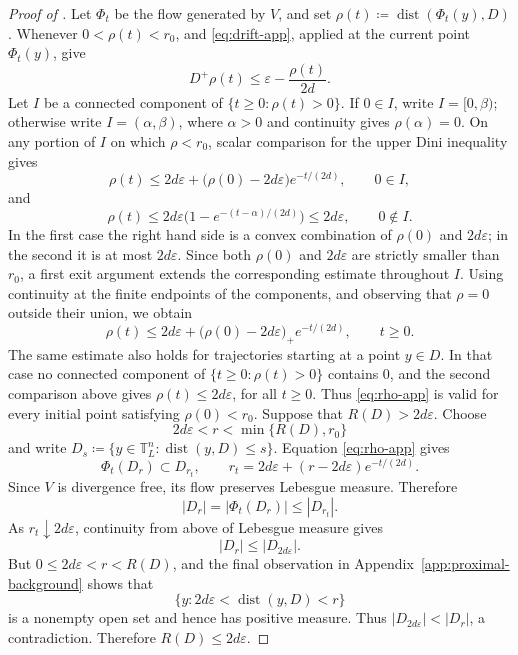 \documentclass[11pt,reqno,noamsfonts]{amsart}
\theoremstyle{definition}
\theoremstyle{remark}
\newcommand{\T}{\mathbb T}
\newcommand{\dist}{\operatorname{dist}}
\newcommand{\Dplus}{D^+}
\begin{document}
\begin{proof}[Proof of ]
Let $\Phi_t$ be the flow generated by $V$, and set 
$\rho(t)\coloneqq\dist(\Phi_t(y),D)$. 
Whenever $0<\rho(t)<r_0$,
 and \eqref{eq:drift-app},
applied at the current point $\Phi_t(y)$, give
\[
  \Dplus\rho(t)
  \le\varepsilon-\frac{\rho(t)}{2d}.
\]
Let $I$ be a connected component of
$\{t\ge0:\rho(t)>0\}$. If $0\in I$, write $I=[0,\beta)$;
otherwise write $I=(\alpha,\beta)$, where $\alpha>0$ and continuity
gives $\rho(\alpha)=0$. On any portion of $I$ on which
$\rho<r_0$, scalar comparison for the upper Dini inequality gives
\[
  \rho(t)
  \le
  2d\varepsilon+
  \bigl(\rho(0)-2d\varepsilon\bigr)e^{-t/(2d)},
  \qquad 0\in I,
\]
and
\[
  \rho(t)
  \le
  2d\varepsilon
  \bigl(1-e^{-(t-\alpha)/(2d)}\bigr)
  \le2d\varepsilon,
  \qquad 0\notin I.
\]
In the first case the right hand side is a convex combination of
$\rho(0)$ and $2d\varepsilon$; in the second it is at most
$2d\varepsilon$. Since both $\rho(0)$ and $2d\varepsilon$ are
strictly smaller than $r_0$, a first exit argument extends the
corresponding estimate throughout $I$. Using continuity at the finite
endpoints of the components, and observing that $\rho=0$ outside their
union, we obtain
\begin{equation}\label{eq:rho-app}
  \rho(t)
  \le
  2d\varepsilon+
  \bigl(\rho(0)-2d\varepsilon\bigr)_+e^{-t/(2d)},
  \qquad t\ge0.
\end{equation}
The same estimate also holds for trajectories starting at a point
$y\in D$. In that case no connected component of
$\{t\ge0:\rho(t)>0\}$ contains $0$, and the second comparison above
gives
  $\rho(t)\le 2d\varepsilon$, 
  for all $t\ge0$.
Thus \eqref{eq:rho-app} is valid for every initial point satisfying
$\rho(0)<r_0$.
Suppose that $R(D)>2d\varepsilon$. Choose
\[
  2d\varepsilon<r<\min\{R(D),r_0\}
\]
and write
  $D_s\coloneqq\{y\in\T_L^n:\dist(y,D)\le s\}$.
Equation \eqref{eq:rho-app} gives
\[
  \Phi_t(D_r)\subset D_{r_t},
  \qquad
  r_t=2d\varepsilon+
      (r-2d\varepsilon)e^{-t/(2d)}.
\]
Since $V$ is divergence free, its flow preserves Lebesgue measure.
Therefore
\[
  |D_r|
  =
  |\Phi_t(D_r)|
  \le
  |D_{r_t}|.
\]
As $r_t\downarrow2d\varepsilon$, continuity from above of Lebesgue
measure gives
\[
  |D_r|\le|D_{2d\varepsilon}|.
\]
But $0\le2d\varepsilon<r<R(D)$, and the final observation in
Appendix~\ref{app:proximal-background} shows that
\[
  \{y:2d\varepsilon<\dist(y,D)<r\}
\]
is a nonempty open set and hence has positive measure. Thus
  $|D_{2d\varepsilon}|<|D_r|$,
a contradiction. Therefore $R(D)\le2d\varepsilon$.
\end{proof}
\end{document}
